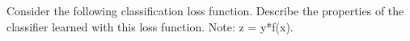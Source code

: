 Consider the following classification loss function. Describe the properties of the classifier learned with this loss function. Note: z = y*f(x).


